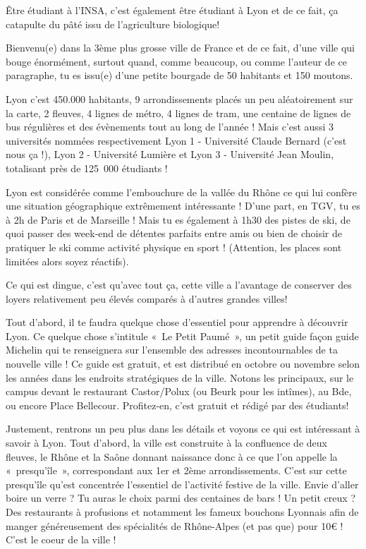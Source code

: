 Être étudiant à l'INSA, c'est également être étudiant à Lyon et de ce fait, ça
catapulte du pâté issu de l'agriculture biologique!

Bienvenu(e) dans la 3ème plus grosse ville de France et de ce fait, d'une ville
qui bouge énormément, surtout quand, comme beaucoup, ou comme l'auteur de ce
paragraphe, tu es issu(e) d'une petite bourgade de 50 habitants et 150 moutons.

Lyon c'est 450.000 habitants, 9 arrondissements placés un peu aléatoirement sur
la carte, 2 fleuves, 4 lignes de métro, 4 lignes de tram, une centaine de lignes
de bus régulières et des évènements tout au long de l'année ! Mais c'est aussi 3
universités nommées respectivement Lyon 1 - Université Claude Bernard (c'est
nous ça !), Lyon 2 - Université Lumière et Lyon 3 - Université Jean
Moulin, totalisant près de 125~000 étudiants !

Lyon est considérée comme l'embouchure de la vallée du Rhône ce qui lui confère
une situation géographique extrêmement intéressante ! D'une part, en TGV, tu es
à 2h de Paris et de Marseille ! Mais tu es également à 1h30 des pistes de ski,
de quoi passer des week-end de détentes parfaits entre amis ou bien de
choisir de pratiquer le ski comme activité physique en sport ! (Attention,
les places sont limitées alors soyez réactifs).

Ce qui est dingue, c'est qu'avec tout ça, cette ville a l'avantage de conserver
des loyers relativement peu élevés comparés à d'autres grandes villes!

Tout d'abord, il te faudra quelque chose d'essentiel pour apprendre à découvrir
Lyon. Ce quelque chose s'intitule «~Le Petit Paumé~», un petit guide façon guide
Michelin qui te renseignera sur l'ensemble des adresses incontournables de ta
nouvelle ville ! Ce guide est gratuit, et est distribué en octobre ou novembre
selon les années dans les endroits stratégiques de la ville. Notons les
principaux, sur le campus devant le restaurant Castor/Polux (ou Beurk pour les
intîmes), au Bde, ou encore Place Bellecour. Profitez-en, c'est gratuit
et rédigé par des étudiants!

Justement, rentrons un peu plus dans les détails et voyons ce qui est
intéressant à savoir à Lyon. Tout d'abord, la ville est construite à la
confluence de deux fleuves, le Rhône et la Saône donnant naissance donc à ce que
l'on appelle la «~presqu'île~», correspondant aux 1er et 2ème arrondissements.
C'est sur cette presqu'île qu'est concentrée l'essentiel de l'activité festive
de la ville. Envie d'aller boire un verre ? Tu auras le choix parmi des
centaines de bars ! Un petit creux ? Des restaurants à profusions et notamment
les fameux bouchons Lyonnais afin de manger généreusement des spécialités de
Rhône-Alpes (et pas que) pour 10€ ! C'est le coeur de la ville !

